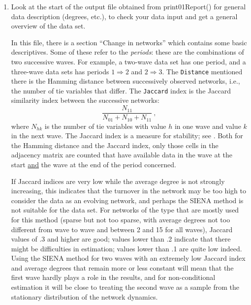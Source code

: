 \documentclass[a4paper,fleqn,11pt]{article}
\newcommand{\+}{\, + \,}
\newcommand{\sfn}[1]{\textsf{#1}}
\newcommand{\SI}{{\sf SIENA }}
\begin{document}
\begin{enumerate}
\item Look at the start of the output file obtained from
       \sfn{print01Report()} for general data
      description (degrees, etc.), to check your data input
      and get a general overview of the data set.

      In this file, there is a section ``Change in networks'' which contains
      some basic descriptives. Some of these refer to the \emph{periods}:
      these are the combinations of two successive waves.
      For example, a two-wave data set has one period, and a
      three-wave data sets has periods $1 \Rightarrow 2$ and $2 \Rightarrow 3$.
      The \texttt{Distance} mentioned there
      is the Hamming distance between successively observed networks, i.e.,
      the number of tie variables that differ.
      The \texttt{Jaccard} index is the Jaccard similarity index between the
      successive networks:
      \[
         \frac{N_{11}}{N_{01}+N_{10}+N_{11}} \ ,
      \]
      where $N_{hk}$ is the number of tie variables with value $h$ in one
      wave and value $k$ in the next wave. The Jaccard index is a measure for
      stability; see \citet{SnijdersEA10b}.
      Both for the Hamming distance and the Jaccard index, only those cells
      in the adjacency matrix are counted that have available data in the wave
      at the start \underline{and} the wave at the end of the period concerned.

      If Jaccard indices are very low while the average
      degree is not strongly increasing, this indicates
      that the turnover in the network may be too high to consider
      the data as an evolving network, and perhaps the \SI method
      is not suitable for the data set.
      For networks of the type that are mostly used for this method
      (sparse but not too sparse,
      with average degrees not too different from wave to wave
      and between 2 and 15 for all waves),
      Jaccard values of .3 and higher
      are good; values lower than .2 indicate that there might be difficulties
      in estimation; values lower than .1 are quite low indeed.
      Using the \SI method for two waves with an extremely low Jaccard
      index and average degrees that remain more or less constant
      will mean that the first wave hardly plays a role in the results, and
      for non-conditional estimation it will be close to treating the second wave as
      a sample from the stationary distribution of the network dynamics.


\end{enumerate}
\end{document}
